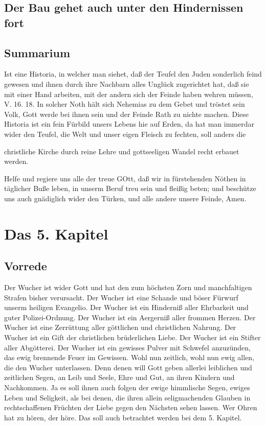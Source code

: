 
\section{Der Bau gehet auch unter den Hindernissen fort}

\section{Summarium}

Ist eine Historia, in welcher man siehet, daß der Teufel den Juden sonderlich feind gewesen und ihnen durch ihre Nachbarn alles Unglück zugerichtet hat, daß sie mit einer Hand arbeiten, mit der andern sich der Feinde haben wehren müssen, V. 16. 18. In solcher Noth hält sich Nehemias zu dem Gebet und tröstet sein Volk, Gott werde bei ihnen sein und der Feinde Rath zu nichte machen. Diese Historia ist ein fein Fürbild unsers Lebens hie auf Erden, da hat man immerdar wider den Teufel, die Welt und unser eigen Fleisch zu fechten, soll anders die

christliche Kirche durch reine Lehre und gottseeligen Wandel recht erbauet werden.

Helfe und regiere uns alle der treue GOtt, daß wir in fürstehenden Nöthen in täglicher Buße leben, in unserm Beruf treu sein und fleißig beten; und beschütze uns auch gnädiglich wider den Türken, und alle andere unsere Feinde, Amen.

\chapter{Das 5. Kapitel}

\section{Vorrede}

Der Wucher ist wider Gott und hat den zum höchsten Zorn und manchfaltigen Strafen bisher verursacht. Der Wucher ist eine Schande und böser Fürwurf unserm heiligen Evangelio. Der Wucher ist ein Hinderniß aller Ehrbarkeit und guter Polizei-Ordnung. Der Wucher ist ein Aergerniß aller frommen Herzen. Der Wucher ist eine Zerrüttung aller göttlichen und christlichen Nahrung. Der Wucher ist ein Gift der christlichen brüderlichen Liebe. Der Wucher ist ein Stifter aller Abgötterei. Der Wucher ist ein gewisses Pulver mit Schwefel anzuzünden, das ewig brennende Feuer im Gewissen. Wohl nun zeitlich, wohl nun ewig allen, die den Wucher unterlassen. Denn denen will Gott geben allerlei leiblichen und zeitlichen Segen, an Leib und Seele, Ehre und Gut, an ihren Kindern und Nachkommen. Ja es soll ihnen auch folgen der ewige himmlische Segen, ewiges Leben und Seligkeit, als bei denen, die ihren allein seligmachenden Glauben in rechtschaffenen Früchten der Liebe gegen den Nächsten sehen lassen. Wer Ohren hat zu hören, der höre. Das soll auch betrachtet werden bei dem 5. Kapitel.

